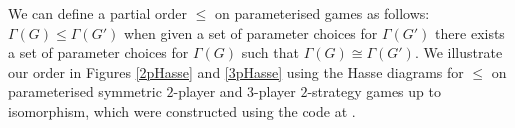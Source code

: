 	We can define a partial order $\leq$ on parameterised games as follows: $\Gamma(G) \leq \Gamma(G')$ when given a set of parameter choices for $\Gamma(G')$ there exists a set of parameter choices for $\Gamma(G)$ such that $\Gamma(G) \cong \Gamma(G')$. We illustrate our order in Figures \ref{2pHasse} and \ref{3pHasse} using the Hasse diagrams for $\leq$ on parameterised symmetric $2$-player and $3$-player $2$-strategy games up to isomorphism, which were constructed using the code at \cite{GLCode}.

	\begin{figure}[!ht]
		\begin{center}
\end{center}
\end{figure}
